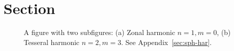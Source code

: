 \section{Section}
\lipsum[3]

\begin{figure}[t]
\begin{subfigure}[c]{0.495\textwidth}
%
\subcaption{\label{fig:zonal}}
\end{subfigure}
\begin{subfigure}[c]{0.495\textwidth}
%
\subcaption{\label{fig:tesseral}}%
\end{subfigure}%
\caption{A figure with two subfigures: (a) Zonal harmonic $n=1, m=0$, (b) Tesseral harmonic $n=2, m=3$. See Appendix~\ref{sec:sph-har}.}\label{fig:1}
\end{figure}

